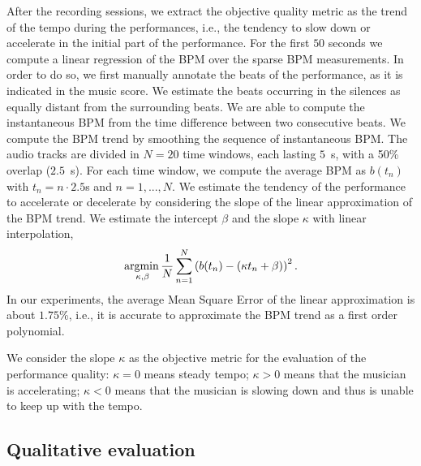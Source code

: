 After the recording sessions, we extract the objective quality metric as the trend of the tempo during the performances, i.e., the tendency to slow down or accelerate in the initial part of the performance. For the first $50$ seconds we compute a linear regression of the BPM over the sparse BPM measurements. In order to do so, we first manually annotate the beats of the performance, as it is indicated in the music score. We estimate the beats occurring in the silences as equally distant from the surrounding beats. We are able to compute the instantaneous BPM from the time difference between two consecutive beats. We compute the BPM trend by smoothing the sequence of instantaneous BPM. The audio tracks are divided in $N=20$ time windows, each lasting $5$~s, with a 50\% overlap ($2.5$~s). For each time window, we compute the average BPM as $b(t_n)$ with $t_n=n\cdot 2.5$s and $n=1,...,N$. We estimate the tendency of the performance to accelerate or decelerate by considering the slope of the linear approximation of the BPM trend. We estimate the intercept $\beta$ and the slope $\kappa$ with linear interpolation, 
\begin{equation}
\underset{\kappa, \beta}{\operatorname{argmin}\,} \frac{1}{N} \sum_{n=1}^{N} \left(b(t_n)-(\kappa t_n + \beta)\right)^2.
\end{equation}
In our experiments, the average Mean Square Error of the linear approximation is about $1.75$\%, i.e., it is accurate to approximate the BPM trend as a first order polynomial.

We consider the slope $\kappa$ as the objective metric for the evaluation of the performance quality: $\kappa=0$ means steady tempo; $\kappa>0$ means that the musician is accelerating; $\kappa<0$ means that the musician is slowing down and thus is unable to keep up with the tempo. 
%



\subsection{Qualitative evaluation}\label{sec:NMP:qualResults}

